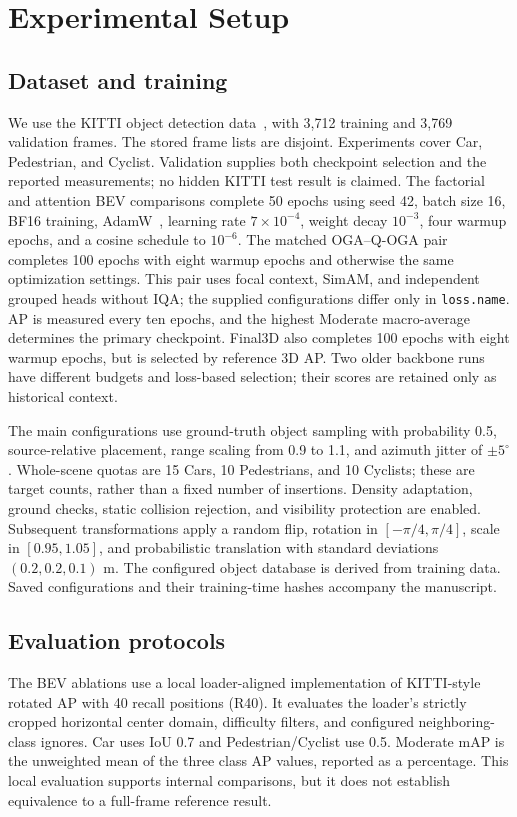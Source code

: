 \section{Experimental Setup}
\label{sec:setup}
\subsection{Dataset and training}
We use the KITTI object detection data~\cite{geiger2012kitti}, with 3,712 training and 3,769 validation frames. The stored frame lists are disjoint. Experiments cover Car, Pedestrian, and Cyclist. Validation supplies both checkpoint selection and the reported measurements; no hidden KITTI test result is claimed. The factorial and attention BEV comparisons complete 50 epochs using seed 42, batch size 16, BF16 training, AdamW~\cite{loshchilov2019adamw}, learning rate $7\times10^{-4}$, weight decay $10^{-3}$, four warmup epochs, and a cosine schedule to $10^{-6}$. The matched OGA--Q-OGA pair completes 100 epochs with eight warmup epochs and otherwise the same optimization settings. This pair uses focal context, SimAM, and independent grouped heads without IQA; the supplied configurations differ only in \texttt{loss.name}. AP is measured every ten epochs, and the highest Moderate macro-average determines the primary checkpoint. Final3D also completes 100 epochs with eight warmup epochs, but is selected by reference 3D AP. Two older backbone runs have different budgets and loss-based selection; their scores are retained only as historical context.

The main configurations use ground-truth object sampling with probability 0.5, source-relative placement, range scaling from 0.9 to 1.1, and azimuth jitter of $\pm5^\circ$. Whole-scene quotas are 15 Cars, 10 Pedestrians, and 10 Cyclists; these are target counts, rather than a fixed number of insertions. Density adaptation, ground checks, static collision rejection, and visibility protection are enabled. Subsequent transformations apply a random flip, rotation in $[-\pi/4,\pi/4]$, scale in $[0.95,1.05]$, and probabilistic translation with standard deviations $(0.2,0.2,0.1)$ m. The configured object database is derived from training data. Saved configurations and their training-time hashes accompany the manuscript.

\subsection{Evaluation protocols}
\label{sec:protocols}
The BEV ablations use a local loader-aligned implementation of KITTI-style rotated AP with 40 recall positions (R40). It evaluates the loader's strictly cropped horizontal center domain, difficulty filters, and configured neighboring-class ignores. Car uses IoU 0.7 and Pedestrian/Cyclist use 0.5. Moderate mAP is the unweighted mean of the three class AP values, reported as a percentage. This local evaluation supports internal comparisons, but it does not establish equivalence to a full-frame reference result.

